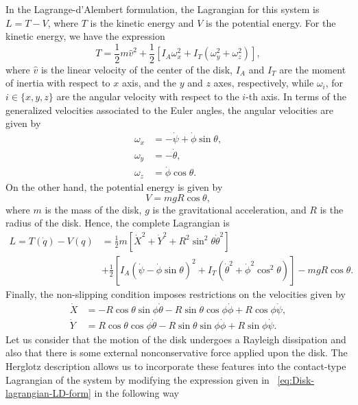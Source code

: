 \documentclass{aims}
\numberwithin{equation}{section}
\theoremstyle{definition}
\begin{document}
In the Lagrange-d'Alembert formulation, the Lagrangian for this system is $L = T- V$, where $T$ is the kinetic energy and $V$ is the potential energy. For the kinetic energy, we have the expression
\begin{equation}
  T = \frac{1}{2}m\hat{v}^2 + \frac{1}{2} [I_A \omega_x^2 + I_T (\omega_y^2 + \omega_z^2)],
\end{equation}
where $\hat{v}$ is the linear velocity of the center of the disk, $I_A$ and $I_T$ are the moment of inertia with respect to $x$ axis, and the $y$ and $z$ axes, respectively, while $\omega_i$, for $i\in\{x, y, z\}$ are the angular velocity with respect to the $i$-th axis. In terms of the generalized velocities associated to the Euler angles, the angular velocities are given by
\begin{equation}
\begin{split}
  \omega_x &= -\dot{\psi} + \dot{\phi} \sin\theta, \\
  \omega_y &= -\dot{\theta}, \\
  \omega_z &= \dot{\phi} \cos\theta.
\end{split}
\end{equation}
On the other hand, the potential energy is given by
\[V = m g R \cos \theta,\]
where $m$ is the mass of the disk, $g$ is the gravitational acceleration, and $R$ is the radius of the disk. Hence, the complete Lagrangian is
\begin{equation}\label{eq:Disk-lagrangian-LD-form}
\begin{split}
  L = T(\dot{q}) - V(q) &= \frac{1}{2} m [\dot{X}^2 + \dot{Y}^2 + R^2 \sin^2\theta \dot{\theta}^2] \\
  &+ \frac{1}{2} \left[ I_A \left( \dot{\psi} - \dot{\phi} \sin\theta \right)^2 + 
  I_T \left( \dot{\theta}^2 + \dot{\phi}^2 \cos^2\theta \right) \right] - m g R \cos\theta.
\end{split}
\end{equation}
Finally, the non-slipping condition imposes restrictions on the velocities given by
\begin{equation} \label{eq:disco_que_cae_restricciones}
\begin{split}
  \dot{X} &= - R \cos\theta \sin\phi \dot{\theta} - R \sin\theta \cos\phi \dot{\phi} + R \cos\phi \dot{\psi}, \\
  \dot{Y} &= R \cos\theta \cos\phi \dot{\theta} - R \sin\theta \sin\phi \dot{\phi} + R \sin\phi \dot{\psi}.
\end{split}
\end{equation}
Let us consider that the motion of the disk undergoes a Rayleigh dissipation and also that there is some external nonconservative force applied upon the disk. The Herglotz description allows us to incorporate these features into the contact-type Lagrangian of the system by modifying the expression given in ~\eqref{eq:Disk-lagrangian-LD-form} in the following way
\end{document}
